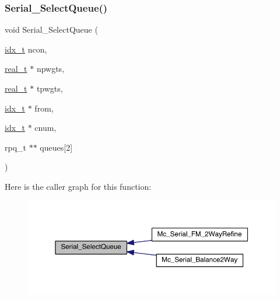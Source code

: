 \subsubsection{\texorpdfstring{Serial\+\_\+\+Select\+Queue()}{Serial\_SelectQueue()}}
{\footnotesize\ttfamily void Serial\+\_\+\+Select\+Queue (\begin{DoxyParamCaption}\item[{\hyperlink{a00876_aaa5262be3e700770163401acb0150f52}{idx\+\_\+t}}]{ncon,  }\item[{\hyperlink{a00876_a1924a4f6907cc3833213aba1f07fcbe9}{real\+\_\+t} $\ast$}]{npwgts,  }\item[{\hyperlink{a00876_a1924a4f6907cc3833213aba1f07fcbe9}{real\+\_\+t} $\ast$}]{tpwgts,  }\item[{\hyperlink{a00876_aaa5262be3e700770163401acb0150f52}{idx\+\_\+t} $\ast$}]{from,  }\item[{\hyperlink{a00876_aaa5262be3e700770163401acb0150f52}{idx\+\_\+t} $\ast$}]{cnum,  }\item[{rpq\+\_\+t $\ast$$\ast$}]{queues\mbox{[}2\mbox{]} }\end{DoxyParamCaption})}

Here is the caller graph for this function\+:\nopagebreak
\begin{figure}[H]
\begin{center}
\leavevmode
\includegraphics[width=350pt]{a00407_a9f3e61c58695c143989d96c57154fb80_icgraph}
\end{center}
\end{figure}
\mbox{\label{a00407_a9f0787bb9b0a641e0f5cdcbb6152ff1f}} 
